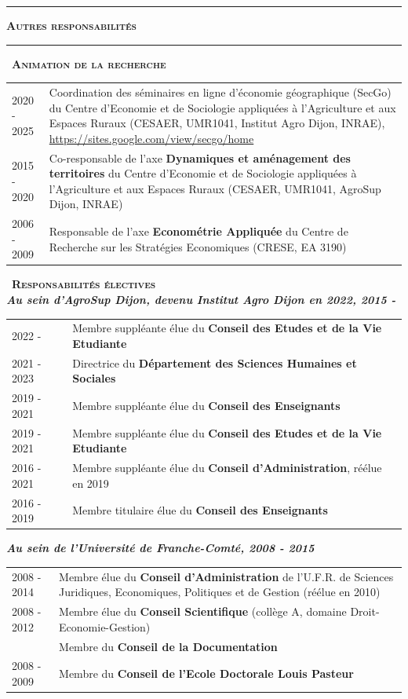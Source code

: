 \documentclass[a4paper,12pt]{article}
\newcommand{\titre}[1]{%
	\bigskip
	\noindent \rule[2mm]{\textwidth}{0.5pt}
	\textbf{\textsc{\large #1}} \\
	\noindent \rule[1mm]{\textwidth}{0.5pt}
	}
\newcommand{\smalltitre}[1]{%
	\noindent \textbullet~\textsc{\textbf{#1}}
	\smallskip
	}
\begin{document}

\titre{Autres responsabilités}

\smalltitre{Animation de la recherche}

\noindent \begin{longtable}{@{}p{\annee}p{\texte}@{}}
2020 - 2025	& Coordination des séminaires en ligne d'économie géographique (SecGo) du Centre d'Economie et de Sociologie appliquées à l'Agriculture et aux Espaces Ruraux (CESAER, UMR1041, Institut Agro Dijon, INRAE), \url{https://sites.google.com/view/secgo/home} \\
2015 -  2020	& Co-responsable de l'axe \textbf{Dynamiques et aménagement des territoires} du Centre d'Economie et de Sociologie appliquées à l'Agriculture et aux Espaces Ruraux (CESAER, UMR1041, AgroSup Dijon, INRAE) \\
2006 - 2009 	& Responsable de l'axe \textbf{Econométrie Appliquée} du Centre de Recherche sur les Stratégies Economiques (CRESE, EA 3190) \\
\end{longtable} 

\smalltitre{Responsabilités électives} \\

\noindent \textit{\textbf{Au sein d'AgroSup Dijon, devenu Institut Agro Dijon en 2022, 2015 - }}

\noindent \begin{longtable}{@{}p{\annee}p{\texte}@{}}
	2022 - 	& Membre suppléante élue du \textbf{Conseil des Etudes et de la Vie Etudiante} \\
	2021 - 2023	& Directrice du \textbf{Département des Sciences Humaines et Sociales} \\	
	2019 - 2021	& Membre suppléante élue du \textbf{Conseil des Enseignants} \\
	2019 - 2021	& Membre suppléante élue du \textbf{Conseil des Etudes et de la Vie Etudiante} \\
	2016 - 2021	& Membre suppléante élue du \textbf{Conseil d'Administration}, réélue en 2019 \\	
	2016 - 2019	& Membre titulaire élue du \textbf{Conseil des Enseignants} \\	
\end{longtable}

\noindent \textit{\textbf{Au sein de l'Université de Franche-Comté, 2008 - 2015}}

\noindent \begin{longtable}{@{}p{\annee}p{\texte}@{}}
	2008 - 2014	& Membre élue du \textbf{Conseil d'Administration} de l'U.F.R. de Sciences Juridiques, Economiques, Politiques et de Gestion (réélue en 2010) \\
	2008 - 2012 & Membre élue du \textbf{Conseil Scientifique} (collège A, domaine Droit-Economie-Gestion) \\
	& Membre du \textbf{Conseil de la Documentation} \\
	2008 - 2009 & Membre du \textbf{Conseil de l'Ecole Doctorale Louis Pasteur} \\
\end{longtable}
\end{document}
